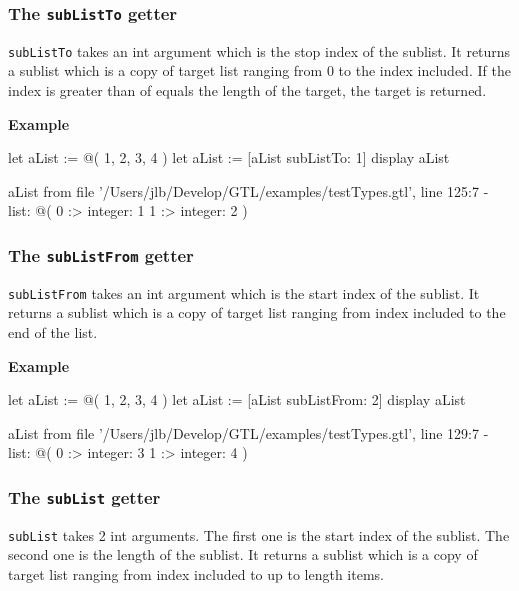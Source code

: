 \documentclass[10pt,openright,twosides]{report}
\newcommand{\gtlarg}[1]{{\footnotesize\ttfamily\colorbox{light-blue}{#1}}}
\newcommand{\gtlinline}[1]{\colorbox{light-blue}{\lstinline[language=gtl]{#1}}}
\newcommand{\example}{\vspace{.75em}\noindent\textbf{Example}\vspace{0em}}
\begin{document}
\subsubsection{The \texttt{subListTo} getter}

\gtlinline{subListTo} takes an int argument which is the stop \gtlarg{index} of the sublist. It returns a sublist which is a copy of target list ranging from 0 to the \gtlarg{index} included. If the \gtlarg{index} is greater than of equals the length of the target, the target is returned.

\example
\begin{gtl}
let aList := @( 1, 2, 3, 4 )
let aList := [aList subListTo: 1]
display aList
\end{gtl}
\begin{console}
aList from file '/Users/jlb/Develop/GTL/examples/testTypes.gtl', line 125:7
  - list: @(
    0 :>
        integer: 1
    1 :>
        integer: 2
)
\end{console}

\subsubsection{The \texttt{subListFrom} getter}

\gtlinline{subListFrom} takes an int argument which is the start \gtlarg{index} of the sublist. It returns a sublist which is a copy of target list ranging from \gtlarg{index} included to the end of the list. 

\example
\begin{gtl}
let aList := @( 1, 2, 3, 4 )
let aList := [aList subListFrom: 2]
display aList
\end{gtl}
\begin{console}
aList from file '/Users/jlb/Develop/GTL/examples/testTypes.gtl', line 129:7
  - list: @(
    0 :>
        integer: 3
    1 :>
        integer: 4
)
\end{console}

\subsubsection{The \texttt{subList} getter}

\gtlinline{subList} takes 2 int arguments. The first one is the start \gtlarg{index} of the sublist. The second one is the \gtlarg{length} of the sublist. It returns a sublist which is a copy of target list ranging from \gtlarg{index} included to up to \gtlarg{length} items.
\end{document}
